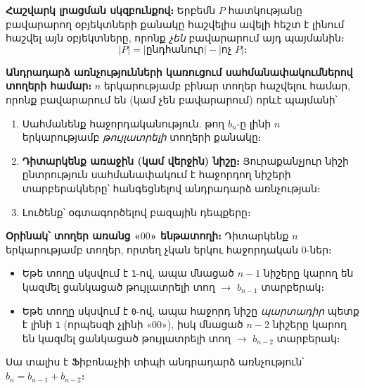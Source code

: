 \documentclass[12pt, a4paper]{article}
\begin{document}
\begin{theorybox}
\textbf{Հաշվարկ լրացման սկզբունքով։}\;
Երբեմն $P$ հատկությանը բավարարող օբյեկտների քանակը հաշվելիս ավելի հեշտ է լինում հաշվել այն օբյեկտները, որոնք \emph{չեն} բավարարում այդ պայմանին։
\[
  |P| = |\text{ընդհանուր}| - |\text{ոչ } P|\text{։}
\]

\textbf{Անդրադարձ առնչությունների կառուցում սահմանափակումներով տողերի համար։}\;
$n$ երկարությամբ բինար տողեր հաշվելու համար, որոնք բավարարում են (կամ չեն բավարարում) որևէ պայմանի՝
\begin{enumerate}[nosep]
  \item Սահմանենք հաջորդականություն. թող $b_n$-ը լինի $n$ երկարությամբ \emph{թույլատրելի} տողերի քանակը։
  \item \textbf{Դիտարկենք առաջին (կամ վերջին) նիշը։}\;
        Յուրաքանչյուր նիշի ընտրություն սահմանափակում է հաջորդող նիշերի տարբերակները՝ հանգեցնելով անդրադարձ առնչության։
  \item Լուծենք՝ օգտագործելով բազային դեպքերը։
\end{enumerate}

\medskip
\textbf{Օրինակ՝ տողեր առանց «$00$» ենթատողի։}\;
Դիտարկենք $n$ երկարությամբ տողեր, որտեղ չկան երկու հաջորդական $0$-ներ։
\begin{itemize}[nosep]
  \item Եթե տողը սկսվում է \texttt{1}-ով, ապա մնացած $n-1$ նիշերը կարող են կազմել ցանկացած թույլատրելի տող $\longrightarrow$ $b_{n-1}$ տարբերակ։
  \item Եթե տողը սկսվում է \texttt{0}-ով, ապա հաջորդ նիշը \emph{պարտադիր} պետք է լինի \texttt{1} (որպեսզի չլինի «$00$»), իսկ մնացած $n-2$ նիշերը կարող են կազմել ցանկացած թույլատրելի տող $\longrightarrow$ $b_{n-2}$ տարբերակ։
\end{itemize}
Սա տալիս է Ֆիբոնաչիի տիպի անդրադարձ առնչություն՝ $b_n = b_{n-1} + b_{n-2}$։

\begin{center}
\end{center}
\end{theorybox}
\end{document}
